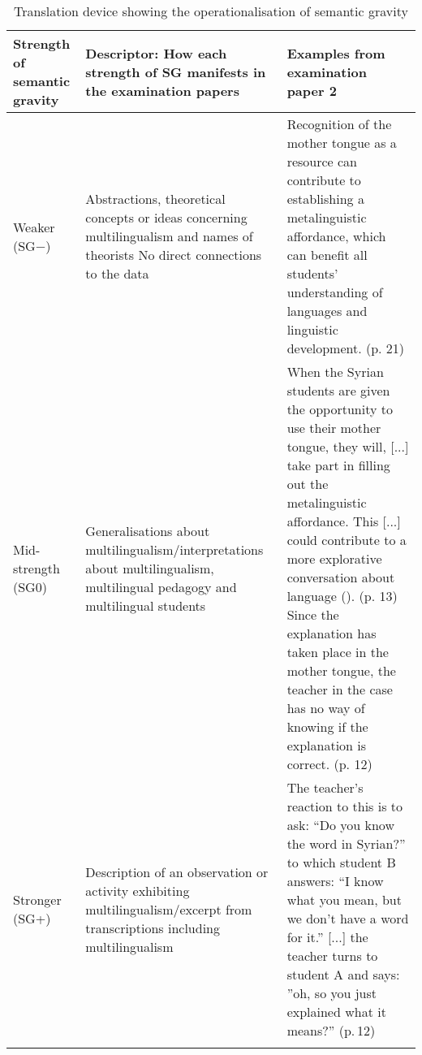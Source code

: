\documentclass[output=paper]{langscibook}
\begin{document}
\begin{table}[hp]
\small
\begin{tabularx}{\textwidth}{>{\raggedright}p{}XX}
\lsptoprule
Strength of semantic gravity & Descriptor: How each strength of SG manifests in the examination papers  & Examples from examination paper 2 \\\midrule
Weaker (SG−) & Abstractions, theoretical concepts or ideas concerning multilingualism and names of theorists\newline
No direct connections to the data & Recognition of the mother tongue as a resource can contribute to establishing a metalinguistic affordance, which can benefit all students’ understanding of languages and linguistic development. (p. 21) \\\addlinespace

Mid-strength (SG0) & Generalisations about multilingualism\slash interpretations about multilingualism, multilingual pedagogy and multilingual students & When the Syrian students are given the opportunity to use their mother tongue, they will, [...] take part in filling out the metalinguistic affordance. This [...] could contribute to a more explorative conversation about language (\citealt[113--114]{Daugaard2013}). (p. 13)\newline
Since the explanation has taken place in the mother tongue, the teacher in the case has no way of knowing if the explanation is correct. (p. 12) \\\addlinespace

Stronger (SG+)  &Description of an observation or activity exhibiting multilingualism\slash excerpt from transcriptions including multilingualism   & The teacher’s reaction to this is to ask: “Do you know the word in Syrian?” to which student B answers: “I know what you mean, but we don’t have a word for it.” [...] the teacher turns to student A and says: ”oh, so you just explained what it means?” (p.\,12) \\
\lspbottomrule
\end{tabularx}
\caption{Translation device showing the operationalisation of semantic gravity} 
\label{tab:ostergaard:1}
\end{table}
\end{document}
